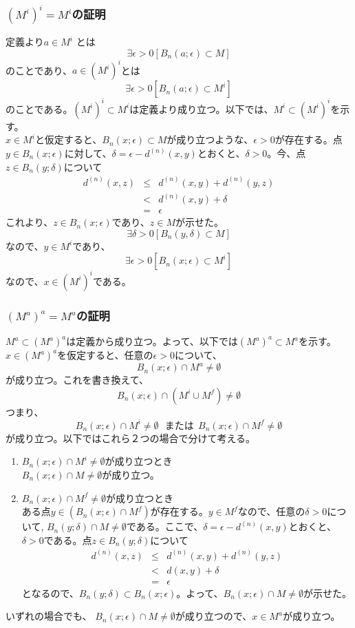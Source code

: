 \documentclass{jsarticle}
\begin{document}
\subsubsection{$(M^i)^i=M^i$の証明}
定義より$a\in M^i$ とは
\[  \exists \epsilon > 0 [B_n(a;\epsilon )\subset M] \]
のことであり、$a\in(M^i)^i$とは
\[\exists \epsilon > 0 [B_n(a;\epsilon )\subset M^i] \]
のことである。$(M^i)^i\subset M^i$は定義より成り立つ。以下では、$M^i\subset (M^i)^i$を示す。\\
$x\in M^i$と仮定すると、$B_n(x;\epsilon)\subset M$が成り立つような、$\epsilon >0$が存在する。点$y\in B_n(x;\epsilon)$に対して、$\delta = \epsilon-d^{(n)}(x,y)$とおくと、$\delta >0$。今、点$z\in B_n(y;\delta)$について
\begin{eqnarray*}
d^{(n)}(x,z)&\leq&d^{(n)}(x,y)+ d^{(n)}(y,z)\\
 &<& d^{(n)}(x,y)+\delta \\
 &=& \epsilon
\end{eqnarray*}
これより、$z\in B_n(x;\epsilon)$であり、$z\in M$が示せた。\[\exists \delta > 0[B_n(y,\delta)\subset M]\]なので、$y\in M^i$であり、\[\exists\epsilon >0[B_n(x;\epsilon)\subset M^i]\]なので、$x\in (M^i)^i$である。

\subsubsection{$(M^a)^a=M^a$の証明}
$M^a \subset (M^a)^a$は定義から成り立つ。よって、以下では$(M^a)^a\subset M^a$を示す。\\
$x\in (M^a)^a$を仮定すると、任意の$\epsilon > 0$について、
\[B_n(x;\epsilon)\cap M^a \neq \emptyset\]
が成り立つ。これを書き換えて、\[B_n(x;\epsilon)\cap (M^i \cup M^f) \neq \emptyset\]
つまり、\[B_n(x;\epsilon)\cap M^i \neq \emptyset\ \ \ または\ \  B_n(x;\epsilon) \cap M^f \neq \emptyset\]
が成り立つ。以下ではこれら２つの場合で分けて考える。
\begin{enumerate}
\item
 $B_n(x;\epsilon)\cap M^i \neq \emptyset$が成り立つとき\\
 $B_n(x;\epsilon)\cap M \neq \emptyset$が成り立つ。
\item
 $B_n(x;\epsilon) \cap M^f \neq \emptyset$が成り立つとき\\
ある点$y\in(B_n(x;\epsilon)\cap M^f)$が存在する。$y\in M^f$なので、任意の$\delta >0$について,
$B_n(y;\delta)\cap M \neq \emptyset$である。ここで、$\delta=\epsilon-d^{(n)}(x,y)$とおくと、$\delta>0$である。点$z\in B_n(y;\delta)$について
\begin{eqnarray*}
d^{(n)}(x,z) &\leq& d^{(n)}(x,y)+d^{(n)}(y,z)\\
&<& d(x,y)+\delta\\
&=&\epsilon
\end{eqnarray*}
となるので、$B_n(y;\delta)\subset B_n(x;\epsilon)$。よって、$B_n(x;\epsilon)\cap M\neq \emptyset$が示せた。
\end{enumerate}
いずれの場合でも、 $B_n(x;\epsilon)\cap M \neq \emptyset$が成り立つので、$x\in M^a$が成り立つ。
\end{document}
